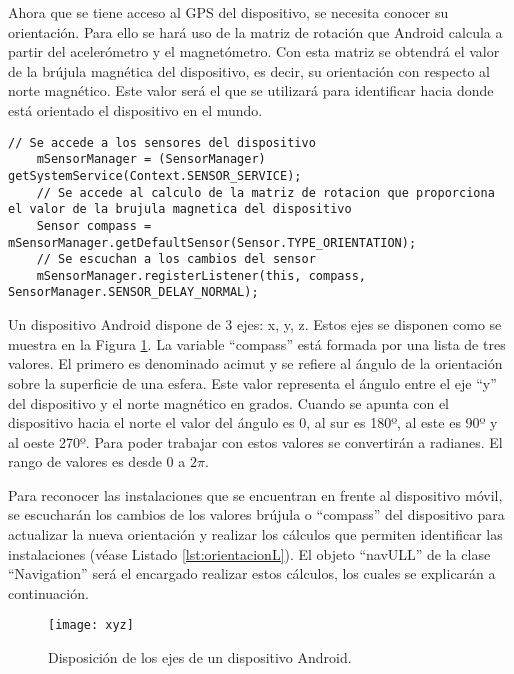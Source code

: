 Ahora que se tiene acceso al GPS del dispositivo, se necesita conocer su orientación. Para ello se hará uso de la matriz de rotación que Android calcula a partir del acelerómetro y el magnetómetro. Con esta matriz se obtendrá el valor de la brújula magnética del dispositivo, es decir, su orientación con respecto al norte magnético. Este valor será el que se utilizará para identificar hacia donde está orientado el dispositivo en el mundo.

\begin{lstlisting}[caption={Código para acceder a la última ubicación registrada del GPS.}, label={lst:ubicacionL}]
    // Se accede a los sensores del dispositivo
    mSensorManager = (SensorManager) getSystemService(Context.SENSOR_SERVICE); 
    // Se accede al calculo de la matriz de rotacion que proporciona el valor de la brujula magnetica del dispositivo
    Sensor compass = mSensorManager.getDefaultSensor(Sensor.TYPE_ORIENTATION);
    // Se escuchan a los cambios del sensor
    mSensorManager.registerListener(this, compass, SensorManager.SENSOR_DELAY_NORMAL);    
\end{lstlisting}
 
Un dispositivo Android dispone de 3 ejes: x, y, z. Estos ejes se disponen como se muestra en la Figura \ref{fig:xyz}. La variable ``compass'' está formada por una lista de tres valores. El primero es denominado acimut y se refiere al ángulo de la orientación sobre la superficie de una esfera. Este valor representa el ángulo entre el eje ``y'' del dispositivo y el norte magnético en grados. Cuando se apunta con el dispositivo hacia el norte el valor del ángulo es 0, al sur es 180º, al este es 90º y al oeste 270º. Para poder trabajar con estos valores se convertirán a radianes.  El rango de valores es desde $0$ a $2\pi$.

Para reconocer las instalaciones que se encuentran en frente al dispositivo móvil, se escucharán los cambios de los valores brújula o ``compass'' del dispositivo para actualizar la nueva orientación y realizar los cálculos que permiten identificar las instalaciones (véase Listado \ref{lst:orientacionL}). El objeto ``navULL'' de la clase ``Navigation'' será el encargado realizar estos cálculos, los cuales se explicarán a continuación.


\begin{figure}[h]
    \centering
    \texttt{[image: xyz]}
    \caption{Disposición de los ejes de un dispositivo Android.}
    \label{fig:xyz}
\end{figure}    

